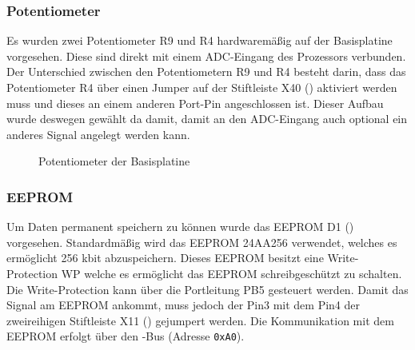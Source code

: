 \subsubsection{Potentiometer}
Es wurden zwei Potentiometer R9 und R4 hardwaremäßig auf der \gls{Basisplatine} vorgesehen. Diese sind direkt mit einem \gls{ADC}-Eingang des Prozessors verbunden. Der Unterschied zwischen den Potentiometern R9 und R4 besteht darin, dass das Potentiometer R4 über einen Jumper auf der Stiftleiste X40 () aktiviert werden muss und dieses an einem anderen Port-Pin angeschlossen ist. Dieser Aufbau wurde deswegen gewählt da damit, damit an den \gls{ADC}-Eingang auch optional ein anderes Signal angelegt werden kann. 

\begin{figure}[H]
    \centering
    \qquad
    \qquad
    \qquad
    \caption[Potentiometer der Basisplatine]{Potentiometer der \gls{Basisplatine}}
    \label{fig:basisplatine-poti}
\end{figure}

\subsubsection{EEPROM}
Um Daten permanent speichern zu können wurde das EEPROM D1 () vorgesehen. Standardmäßig wird das EEPROM 24AA256 verwendet, welches es ermöglicht 256 kbit abzuspeichern. Dieses EEPROM besitzt eine Write-Protection WP welche es ermöglicht das EEPROM schreibgeschützt zu schalten. Die Write-Protection kann über die Portleitung PB5 gesteuert werden. Damit das Signal am EEPROM ankommt, muss jedoch der Pin3 mit dem Pin4 der zweireihigen Stiftleiste X11 () gejumpert werden. Die Kommunikation mit dem EEPROM erfolgt über den \IIC{}-Bus (Adresse \texttt{0xA0}).

